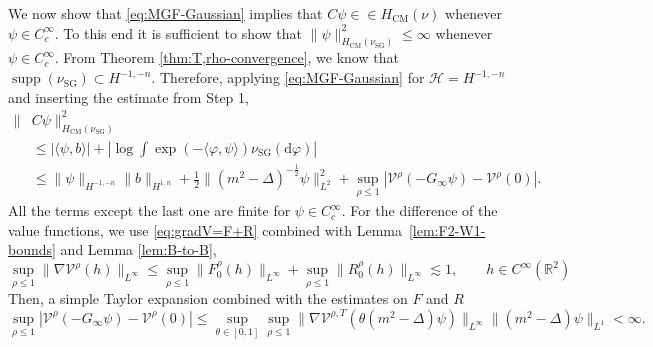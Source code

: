 \documentclass[11pt, a4paper]{scrartcl}
\numberwithin{equation}{section}
\theoremstyle{plain}
\theoremstyle{remark}
\newcommand{\mathd}{\mathrm{d}}
\newcommand{\tmop}[1]{\ensuremath{\operatorname{#1}}}
\newcommand{\tmtextbf}[1]{\text{{\bfseries{#1}}}}
\begin{document}
\tmtextbf{Step 2.}
We now show that \eqref{eq:MGF-Gaussian} implies that $C\psi\in \in H_{\tmop{CM}}(\nu)$
whenever $\psi\in C_c^\infty$.  
To this end it is sufficient to show that $\|\psi\|_{H_{\tmop{CM}}(\nu_{\tmop{SG}})}
^2\leqslant\infty$ whenever $\psi\in C^\infty_c$.
From Theorem \ref{thm:T,rho-convergence}, we know that $\tmop{supp}(\nu_{\tmop{SG}})
\subset H^{-1,-n}$. Therefore, applying \eqref{eq:MGF-Gaussian} for 
$\mathcal{H}=H^{-1,-n}$ and inserting the estimate from Step 1, 
\[
  \begin{aligned}
    \|&C\psi\|_{H_{\tmop{CM}}(\nu_{\tmop{SG}})}^2 \\
        &\leqslant |\langle\psi, b\rangle| + |\log\int\exp(-\langle\varphi,\psi\rangle)
        \nu_{\tmop{SG}}(\mathd\varphi)|\\
        &\leqslant \|\psi\|_{H^{-1,-n}}\|b\|_{H^{1,n}} 
          + \frac{1}{2} \|(m^2-\Delta)^{-\frac{1}{2}}\psi\|^2_{L^2}
          + \sup_{\rho\leqslant 1} |\mathcal{V}^{\rho} (-G_\infty\psi) -
          \mathcal{V}^{\rho} (0)|.
  \end{aligned}
\]
All the terms except the last one are finite for $\psi\in C^\infty_c$.
For the difference of the value functions, we use \eqref{eq:gradV=F+R} 
combined with Lemma~\ref{lem:F2-W1-bounds} and Lemma \ref{lem:B-to-B}, 
\[ \sup_{\rho\leqslant 1}\|\nabla \mathcal{V}^{\rho} (h)\|_{L^\infty} \leqslant
\sup_{\rho\leqslant 1}\|F_0^{\rho} (h)\|_{L^\infty}
+ \sup_{\rho\leqslant 1}\|R_0^{\rho} (h)\|_{L^\infty}\lesssim 1, \qquad h
 \in C^{\infty} (\mathbb{R}^2) 
\] 
Then, a simple Taylor expansion combined with the estimates on $F$ and $R$ 
\[
  \sup_{\rho\leqslant 1} |\mathcal{V}^{\rho} (-G_\infty\psi) -
          \mathcal{V}^{\rho} (0)|
  \leqslant
  \sup_{\theta \in [0, 1]}\sup_{\rho\leqslant 1}
  \| \nabla \mathcal{V}^{\rho, T} (\theta (m^2 - \Delta) \psi)
    \|_{L^{\infty}} \| (m^2 - \Delta) \psi \|_{L^1}<\infty.
\]
\end{document}
